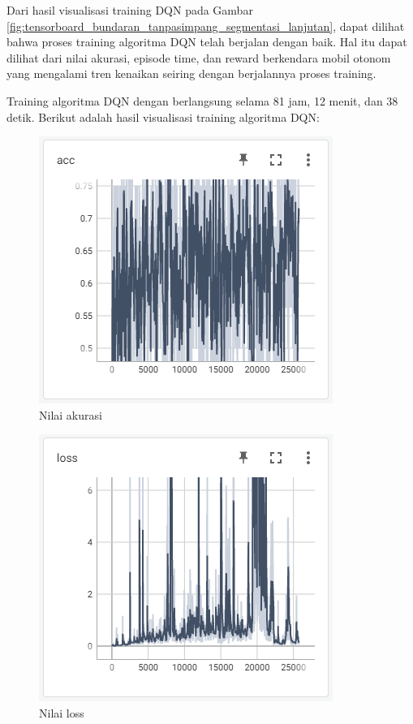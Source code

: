 Dari hasil visualisasi training DQN pada Gambar \ref{fig:tensorboard_bundaran_tanpasimpang_segmentasi_lanjutan}, dapat dilihat bahwa proses training algoritma DQN telah berjalan dengan baik. Hal itu dapat dilihat dari nilai akurasi, episode time, dan reward berkendara mobil otonom yang mengalami tren kenaikan seiring dengan berjalannya proses training.


\iffalse
Training algoritma DQN dengan
berlangsung selama 81 jam, 12 menit, dan 38 detik. Berikut adalah hasil visualisasi training algoritma DQN:

\begin{figure}[H] 
	\centering
	\includegraphics[width=.7\linewidth]{images/acc}
	\caption{Nilai akurasi}
	\label{fig:acc}
\end{figure}
\begin{figure}[H] 
	\centering
	\includegraphics[width=.7\linewidth]{images/loss}
	\caption{Nilai loss}
	\label{fig:loss}
\end{figure}
